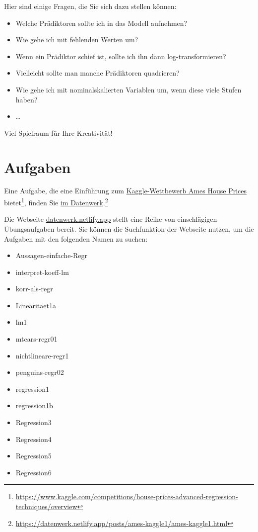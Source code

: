 \documentclass[
  a4paper,
]{scrbook}
\providecommand{\tightlist}{%
  \setlength{\itemsep}{0pt}\setlength{\parskip}{0pt}}\usepackage{longtable,booktabs,array}
\theoremstyle{definition}
\theoremstyle{definition}
\theoremstyle{definition}
\theoremstyle{remark}
\begin{document}
Hier sind einige Fragen, die Sie sich dazu stellen können:

\begin{itemize}
\tightlist
\item
  Welche Prädiktoren sollte ich in das Modell aufnehmen?
\item
  Wie gehe ich mit fehlenden Werten um?
\item
  Wenn ein Prädiktor schief ist, sollte ich ihn dann log-transformieren?
\item
  Vielleicht sollte man manche Prädiktoren quadrieren?
\item
  Wie gehe ich mit nominalskalierten Variablen um, wenn diese viele
  Stufen haben?
\item
  \ldots{}
\end{itemize}

Viel Spielraum für Ihre Kreativität!

\section{Aufgaben}\label{aufgaben-7}

Eine Aufgabe, die eine Einführung zum
\href{https://www.kaggle.com/competitions/house-prices-advanced-regression-techniques/overview}{Kaggle-Wettbewerb
Ames House Prices} bietet\footnote{\url{https://www.kaggle.com/competitions/house-prices-advanced-regression-techniques/overview}},
finden Sie
\href{https://datenwerk.netlify.app/posts/ames-kaggle1/ames-kaggle1.html}{im
Datenwerk}.\footnote{\url{https://datenwerk.netlify.app/posts/ames-kaggle1/ames-kaggle1.html}}

Die Webseite \href{https://datenwerk.netlify.app}{datenwerk.netlify.app}
stellt eine Reihe von einschlägigen Übungsaufgaben bereit. Sie können
die Suchfunktion der Webseite nutzen, um die Aufgaben mit den folgenden
Namen zu suchen:

\begin{itemize}
\tightlist
\item
  Aussagen-einfache-Regr
\item
  interpret-koeff-lm
\item
  korr-als-regr
\item
  Linearitaet1a
\item
  lm1
\item
  mtcars-regr01
\item
  nichtlineare-regr1
\item
  penguins-regr02
\item
  regression1
\item
  regression1b
\item
  Regression3
\item
  Regression4
\item
  Regression5
\item
  Regression6
\end{itemize}
\end{document}
